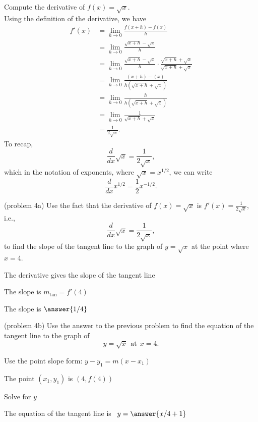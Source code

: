 \documentclass{ximera}
\begin{document}
\begin{example}[example 4]
Compute the derivative of $f(x) = \sqrt x$.\\
Using the definition of the derivative, we have
\begin{align*}
f'(x) &= \lim_{h \to 0} \frac{f(x+h)-f(x)}{h}\\[5pt]
&= \lim_{h \to 0} \frac{\sqrt{x+h}- \sqrt x}{h}\\[5pt]
&= \lim_{h \to 0} \frac{\sqrt{x+h}- \sqrt x}{h} \cdot \frac{\sqrt{x+h}+ \sqrt x}{\sqrt{x+h}+ \sqrt x} \\[5pt]
&= \lim_{h \to 0} \frac{(x+h) - (x)}{h(\sqrt{x+h}+ \sqrt x)}\\[5pt]
&= \lim_{h \to 0} \frac{h}{h(\sqrt{x+h}+ \sqrt x)}\\[5pt]
&= \lim_{h \to 0} \frac{1}{\sqrt{x+h}+ \sqrt x}\\[5pt]
&=  \frac{1}{2 \sqrt x}.
\end{align*}
To recap, 
\[
\frac{d}{dx}\sqrt{x} = \frac{1}{2\sqrt{x}},
\]
which in the notation of exponents, where $\sqrt x = x^{1/2}$, we can write
\[
\frac{d}{dx}x^{1/2} = \frac12 x^{-1/2}.
\]

\end{example}





\begin{problem}(problem 4a)
Use the fact that the derivative of $f(x) = \sqrt{x}$ is $f'(x) = \frac{1}{2\sqrt{x}}$,
i.e., 
\[
\frac{d}{dx}\sqrt{x} = \frac{1}{2\sqrt{x}},
\]
to find the slope of the tangent line to the graph of 
$y = \sqrt{x}$ at the point where $x = 4$.\\
\begin{hint}
The derivative gives the slope of the tangent line
\end{hint}
\begin{hint}
The slope is $m_{\text{tan}} = f'(4)$
\end{hint}
The slope is $\answer{1/4}$
\end{problem}




\begin{problem}(problem 4b)
Use the answer to the previous problem to find the equation of the tangent line to the graph of 
\[
y = \sqrt{x} \ \ \text{at} \ \ x=4.
\]
\begin{hint}
Use the point slope form: $y-y_1 = m(x-x_1)$
\end{hint}
\begin{hint}
The point $(x_1,y_1)$ is $(4, f(4))$
\end{hint}
\begin{hint}
Solve for $y$
\end{hint}
The equation of the tangent line is \ $y = \answer{x/4 +1}$
\end{problem}
\end{document}

